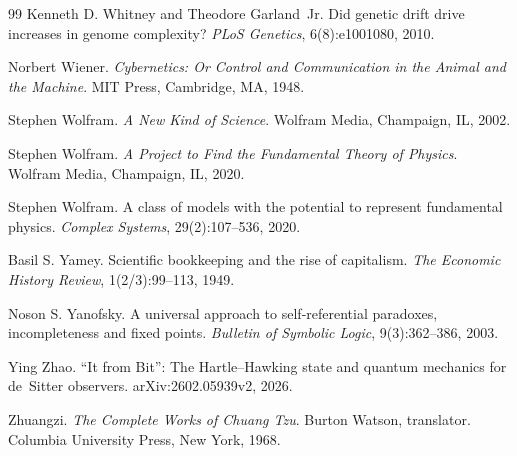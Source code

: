 \documentclass[11pt,a4paper]{article}
\theoremstyle{remark}\newtheorem{remark}[definition]{Remark}
\begin{document}
\begin{thebibliography}{99}
Kenneth D. Whitney and Theodore Garland~Jr.
\newblock Did genetic drift drive increases in genome complexity?
\newblock \emph{PLoS Genetics}, 6(8):e1001080, 2010.

Norbert Wiener.
\newblock \emph{Cybernetics: Or Control and Communication in the Animal and the Machine}.
\newblock MIT Press, Cambridge, MA, 1948.

Stephen Wolfram.
\newblock \emph{A New Kind of Science}.
\newblock Wolfram Media, Champaign, IL, 2002.

Stephen Wolfram.
\newblock \emph{A Project to Find the Fundamental Theory of Physics}.
\newblock Wolfram Media, Champaign, IL, 2020.

Stephen Wolfram.
\newblock A class of models with the potential to represent fundamental physics.
\newblock \emph{Complex Systems}, 29(2):107--536, 2020.

Basil S. Yamey.
\newblock Scientific bookkeeping and the rise of capitalism.
\newblock \emph{The Economic History Review}, 1(2/3):99--113, 1949.

Noson S. Yanofsky.
\newblock A universal approach to self-referential paradoxes, incompleteness and fixed points.
\newblock \emph{Bulletin of Symbolic Logic}, 9(3):362--386, 2003.

Ying Zhao.
\newblock ``It from Bit'': The Hartle--Hawking state and quantum mechanics for de~Sitter observers.
\newblock arXiv:2602.05939v2, 2026.

Zhuangzi.
\newblock \emph{The Complete Works of Chuang Tzu}.
\newblock Burton Watson, translator. Columbia University Press, New York, 1968.

\end{thebibliography}
\end{document}
